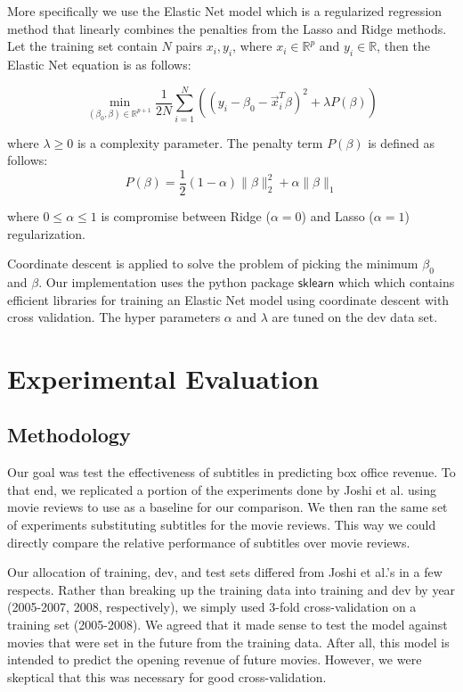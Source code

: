 \documentclass[11pt]{article}
\begin{document}
More specifically we use the Elastic Net model which is a regularized regression method
that linearly combines the penalties from the Lasso and Ridge methods. Let the training
set contain $N$ pairs $x_i,y_i$, where $x_i \in \mathbb{R}^p$ and $y_i \in \mathbb{R}$,
then the Elastic Net equation is as follows:

$$ \min_{(\beta_0, \beta) \in \mathbb{R}^{p+1}} \frac{1}{2N} \sum_{i=1}^N \left(
(y_i - \beta_0 - \vec{x}_i^T\beta)^2 + \lambda P(\beta)\right)$$

\noindent where $\lambda \geq 0$ is a complexity parameter. The penalty term $P(\beta)$
is defined as follows:
$$P(\beta) = \frac{1}{2}(1 - \alpha) \| \beta \|_2^2 + \alpha \|\beta\|_1$$

\noindent where $0 \leq \alpha \leq 1$ is compromise between Ridge ($\alpha = 0$) and
Lasso ($\alpha = 1$) regularization.

Coordinate descent is applied to solve the problem of picking the minimum $\beta_0$ and
$\beta$. Our implementation uses the python package $\mathsf{sklearn}$ which which
contains efficient libraries for training an Elastic Net model using coordinate descent
with cross validation. The hyper parameters $\alpha$ and $\lambda$ are tuned on the dev
data set.

\section{Experimental Evaluation}
\subsection{Methodology}
Our goal was test the effectiveness of subtitles in predicting box office revenue.
To that end, we replicated a portion of the experiments done by Joshi et al. using
movie reviews to use as a baseline for our comparison. We then ran the same set of
experiments substituting subtitles for the movie reviews. This way we could directly
compare the relative performance of subtitles over movie reviews.

Our allocation of training, dev, and test sets differed from Joshi et al.'s in a few
respects. Rather than breaking up the training data into training and dev by year
(2005-2007, 2008, respectively), we simply used 3-fold cross-validation on a training
set (2005-2008). We agreed that it made sense to test the model against movies that were
set in the future from the training data. After all, this model is intended to predict
the opening revenue of future movies. However, we were skeptical that this was necessary
for good cross-validation.
\end{document}
